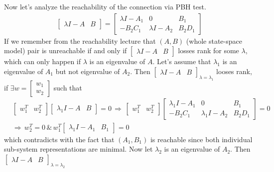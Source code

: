 \documentclass[twoside]{article}
\begin{document}
Now let's analyze the reachability of the connection via PBH test. 
%
\begin{align*}
	\left[ \begin{array}{c|c} \lambda I - A & B \end{array} \right]
	= 
	\left[ \begin{array}{c|c|c} \lambda I - A_1 & 0 & B_1 \\ \hline -B_2 C_1 & \lambda I - A_2 & B_2 D_1 
	\end{array} \right]
\end{align*}
%
If we remember from the reachability lecture that $(A,B)$ (whole state-space model) pair 
is unreachable if and only if $\left[ \begin{array}{c|c} \lambda I - A & B \end{array} \right]$
losses rank for some $\lambda$, which can only happen if $\lambda$ is an eigenvalue of $A$.
Let's assume that $\lambda_1$ is an eigenvalue of $A_1$ but not eigenvalue of $A_2$. 
Then $\left[ \begin{array}{c|c} \lambda I - A & B \end{array} \right]_{\lambda = \lambda_1}$ 
looses rank, if $\exists w = \begin{bmatrix} w_1 \\ w_2 \end{bmatrix}$ such that 
%
\begin{align*}
	&\begin{bmatrix} w_1^T & w_2^T \end{bmatrix} \left[ \begin{array}{c|c} \lambda_1 I - A & B \end{array} \right]
	= 0 \, \Rightarrow \, 
	\begin{bmatrix} w_1^T & w_2^T \end{bmatrix} \left[ \begin{array}{c|c|c} \lambda_1 I - A_1 & 0 & B_1 \\ \hline -B_2 C_1 & \lambda_1 I - A_2 & B_2 D_1 
	\end{array} \right] = 0
	\\
	&\Rightarrow \, w_2^T = 0 \, \& \, w_1^T \left[ \begin{array}{c|c} \lambda_1 I - A_1 & B_1 \end{array} \right] = 0
\end{align*}
%
which contradicts with the fact that $(A_1,B_1)$ is reachable since both individual sub-system representations are minimal. 
Now let $\lambda_2$ is an eigenvalue of $A_2$.
Then $\left[ \begin{array}{c|c} \lambda I - A & B \end{array} \right]_{\lambda = \lambda_2}$ 
\end{document}
